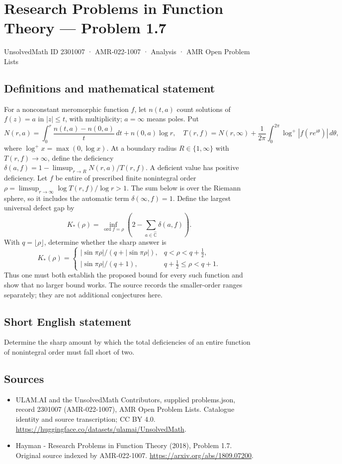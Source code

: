 \documentclass[11pt,a4paper]{article}
\begin{document}
\section*{Research Problems in Function Theory — Problem 1.7}\label{2301007}
{\small UnsolvedMath ID 2301007 · AMR-022-1007 · Analysis · AMR Open Problem Lists}
\subsection{Definitions and mathematical statement}
For a nonconstant meromorphic function $f$, let $n(t,a)$ count solutions of $f(z)=a$ in $|z|\le t$, with multiplicity; $a=\infty$ means poles. Put
\[
N(r,a)=\int_0^r\frac{n(t,a)-n(0,a)}t\,dt+n(0,a)\log r,
\quad T(r,f)=N(r,\infty)+\frac1{2\pi}\int_0^{2\pi}\log^+|f(re^{i\theta})|\,d\theta,
\]
where $\log^+x=\max(0,\log x)$. At a boundary radius $R\in\{1,\infty\}$ with $T(r,f)\to\infty$, define the deficiency
$\delta(a,f)=1-\limsup_{r\to R}N(r,a)/T(r,f)$. A deficient value has positive deficiency.
Let $f$ be entire of prescribed finite nonintegral order
$\rho=\limsup_{r\to\infty}\log T(r,f)/\log r>1$.
The sum below is over the Riemann sphere, so it includes the automatic term $\delta(\infty,f)=1$. Define the largest universal defect gap by
\[
K_*(\rho)=\inf_{\operatorname{ord}f=\rho}\left(2-\sum_{a\in\widehat{\mathbb C}}\delta(a,f)\right).
\]
With $q=\lfloor\rho\rfloor$, determine whether the sharp answer is
\[
K_*(\rho)=
\begin{cases}
|\sin\pi\rho|/(q+|\sin\pi\rho|),&q<\rho<q+\tfrac12,\\
|\sin\pi\rho|/(q+1),&q+\tfrac12\le\rho<q+1.
\end{cases}
\]
Thus one must both establish the proposed bound for every such function and show that no larger bound works. The source records the smaller-order ranges separately; they are not additional conjectures here.
\subsection{Short English statement}
Determine the sharp amount by which the total deficiencies of an entire function of nonintegral order must fall short of two.
\subsection{Sources}
\begin{itemize}
\item[S1] ULAM.AI and the UnsolvedMath Contributors, supplied problems.json, record 2301007 (AMR-022-1007), AMR Open Problem Lists. Catalogue identity and source transcription; CC BY 4.0.
\url{https://huggingface.co/datasets/ulamai/UnsolvedMath}.
\item[S2] Hayman - Research Problems in Function Theory (2018), Problem 1.7. Original source indexed by AMR-022-1007.
\url{https://arxiv.org/abs/1809.07200}.
\end{itemize}
\end{document}

